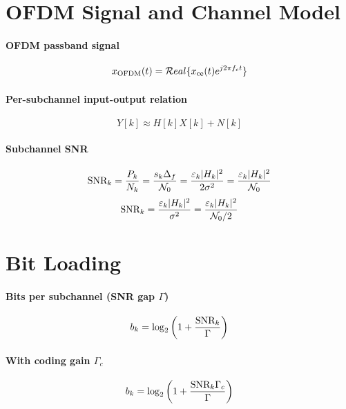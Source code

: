 
\section*{OFDM Signal and Channel Model}

\paragraph{OFDM passband signal}
\begin{equation}
x_{\textrm{OFDM}}(t) = {\mathcal Real \{ x_{\textrm{ce}}(t) e^{j 2 \pi f_c t} \}}
\label{eq:ofdm}
\end{equation}

\paragraph{Per-subchannel input-output relation}
\begin{equation}
Y[k] \approx H[k] X[k] + N[k]
\label{eq:dmt_fundamental_equation}
\end{equation}

\paragraph{Subchannel SNR}
$$
	 {\textrm{SNR}}_k = \frac{P_k}{N_k} = \frac{s_k \Delta_f}{ {\cal N}_0} = \frac{\varepsilon_k |H_k|^2}{2 \sigma^2} = \frac{\varepsilon_k |H_k|^2}{{\cal N}_0}
	 $$
$$
	 {\textrm{SNR}}_k = \frac{\varepsilon_k |H_k|^2}{\sigma^2} = \frac{\varepsilon_k |H_k|^2}{{\cal N}_0/2}
	 $$

\section*{Bit Loading}

\paragraph{Bits per subchannel (SNR gap $\Gamma$)}
\begin{equation}
b_k  = \log_2 \left(1 + \frac{{\textrm{SNR}}_k}{\Gamma }\right)
\label{eq:bitloading2}
\end{equation}

\paragraph{With coding gain $\Gamma_c$}
\begin{equation}
b_k  = \log_2 \left(1 + \frac{{\textrm{SNR}}_k \Gamma_c}{\Gamma }\right)
\label{eq:bitloading3}
\end{equation}

